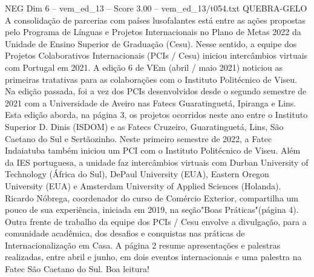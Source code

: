 \begin{textsample}{NEG Dim 6 – vem\_ed\_13 – Score 3.00 – vem\_ed\_13/t054.txt}  \label{ex:f6_neg_046}
QUEBRA-GELO A consolidação de parcerias com países lusofalantes está entre as ações propostas pelo Programa de Línguas e Projetos Internacionais no Plano de Metas 2022 da Unidade de Ensino Superior de Graduação (Cesu).
Nesse sentido, a equipe dos Projetos Colaborativos Internacionais (PCIs / Cesu) iniciou intercâmbios virtuais com Portugal em 2021.
A edição 6 de VEm (abril / maio 2021) noticiou as primeiras tratativas para as colaborações com o Instituto Politécnico de Viseu.
Na edição passada, foi a vez dos PCIs desenvolvidos desde o segundo semestre de 2021 com a Universidade de Aveiro nas Fatecs Guaratinguetá, Ipiranga e Lins.
Esta edição aborda, na página 3, os projetos ocorridos neste ano entre o Instituto Superior D.
Dinis (ISDOM) e as Fatecs Cruzeiro, Guaratinguetá, Lins, São Caetano do Sul e Sertãozinho.
Neste primeiro semestre de 2022, a Fatec Indaiatuba também iniciou um PCI com o Instituto Politécnico de Viseu.
Além da IES portuguesa, a unidade faz intercâmbios virtuais com Durban University of Technology (África do Sul), DePaul University (EUA), Eastern Oregon University (EUA) e Amsterdam University of Applied Sciences (Holanda).
Ricardo Nóbrega, coordenador do curso de Comércio Exterior, compartilha um pouco de sua experiência, iniciada em 2019, na seção"Boas Práticas"(página 4).
Outra frente de trabalho da equipe dos PCIs / Cesu envolve a divulgação, para a comunidade acadêmica, dos desafios e conquistas nas práticas de Internacionalização em Casa.
A página 2 resume apresentações e palestras realizadas, entre abril e junho, em dois eventos internacionais e uma palestra na Fatec São Caetano do Sul.
Boa leitura!

\end{textsample}
